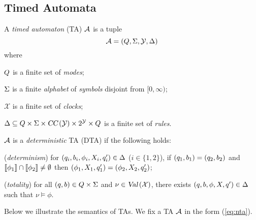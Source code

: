 \subsection{Timed Automata}
\begin{definition}
A \emph{timed automaton} (TA)
$\mathcal{A}$ is a tuple
\begin{equation}\label{eq:nta}
\mathcal{A}=(Q,\Sigma,\mathcal{Y},\Delta)
\end{equation}
where
\begin{compactitem}
\item $Q$ is a finite set of \emph{modes}; %
\item $\Sigma$ is a finite \emph{alphabet} of \emph{symbols} disjoint from $[0,\infty)$;
\item $\mathcal{X}$ is a finite set of \emph{clocks};
\item $\Delta\subseteq Q\times\Sigma\times\mbox{\sl CC}\left(\mathcal{Y}\right)\times 2^{\mathcal{Y}}\times Q$ is a finite set of \emph{rules}.
\end{compactitem}
$\mathcal{A}$ is a \emph{deterministic} TA (DTA) if the following holds:
\begin{compactenum}
\item ({\em determinism}) for $(q_i,b_i,\phi_i,X_i,q'_i)\in\Delta$ ($i\in\{1,2\}$), if $(q_1,b_1)=(q_2,b_2)$ and ${\llbracket}{\phi_1}{\rrbracket}\cap {\llbracket}{\phi_2}{\rrbracket}\ne\emptyset$ then $(\phi_1,X_1,q'_1)=(\phi_2,X_2,q'_2)$;
\item ({\em totality}) for all $(q,b)\in Q\times\Sigma$ and $\nu\in\mbox{\sl Val}\left(\mathcal{X}\right)$, there exists $(q,b,\phi,X,q')\in\Delta$ such that $\nu\models \phi$.
\end{compactenum}
\end{definition}
Below we illustrate the semantics of TAs. We fix a TA $\mathcal{A}$ in the form (\ref{eq:nta}).



